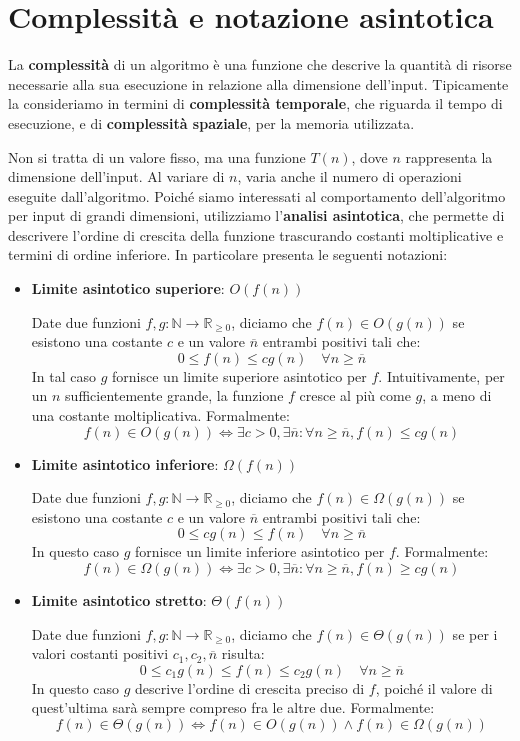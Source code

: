 \section{Complessità e notazione asintotica}
La \textbf{complessità} di un algoritmo è una funzione che descrive la quantità di risorse necessarie alla sua esecuzione in relazione alla dimensione dell’input. Tipicamente la consideriamo in termini di \textbf{complessità temporale}, che riguarda il tempo di esecuzione, e di \textbf{complessità spaziale}, per la memoria utilizzata.\par
Non si tratta di un valore fisso, ma una funzione $T(n)$, dove $n$ rappresenta la dimensione dell’input. Al variare di $n$, varia anche il numero di operazioni eseguite dall’algoritmo. Poiché siamo interessati al comportamento dell’algoritmo per input di grandi dimensioni, utilizziamo l’\textbf{analisi asintotica}, che permette di descrivere l’ordine di crescita della funzione trascurando costanti moltiplicative e termini di ordine inferiore. In particolare presenta le seguenti notazioni:
\begin{itemize}
	\item \textbf{Limite asintotico superiore}: $O(f(n))$\par
	\noindent Date due funzioni $f,g : \mathbb{N} \to \mathbb{R}_{\geq 0}$, diciamo che $f(n)\in O(g(n))$ se esistono una costante $c$ e un valore $\overline{n}$ entrambi positivi tali che: \[0 \leq f(n) \leq cg(n) \quad \forall n \geq \overline{n}\]
	\noindent In tal caso $g$ fornisce un limite superiore asintotico per $f$. Intuitivamente, per un $n$ sufficientemente grande, la funzione $f$ cresce al più come $g$, a meno di una costante moltiplicativa. Formalmente: \[f(n)\in O(g(n)) \iff \exists c>0, \exists\overline{n}: \forall n \geq \overline{n}, f(n)\leq cg(n)\]
	\item \textbf{Limite asintotico inferiore}: $\Omega(f(n))$\par
	\noindent Date due funzioni $f,g : \mathbb{N} \to \mathbb{R}_{\geq 0}$, diciamo che $f(n) \in \Omega(g(n))$ se esistono una costante $c$ e un valore $\overline{n}$ entrambi positivi tali che: \[0 \leq cg(n) \leq f(n)\quad \forall n \geq \overline{n}\]
	\noindent In questo caso $g$ fornisce un limite inferiore asintotico per $f$. Formalmente: \[f(n)\in \Omega(g(n)) \iff \exists c>0, \exists\overline{n} : \forall n \geq \overline{n}, f(n) \geq cg(n)\]
	\item \textbf{Limite asintotico stretto}: $\Theta(f(n))$\par
	\noindent Date due funzioni $f,g : \mathbb{N} \to \mathbb{R}_{\geq 0}$, diciamo che $f(n)\in \Theta(g(n))$ se per i valori costanti positivi $c_1, c_2, \overline{n}$ risulta: \[0 \leq c_1g(n) \leq f(n) \leq c_2g(n)\quad \forall n \geq \overline{n}\]
	\noindent In questo caso $g$ descrive l’ordine di crescita preciso di $f$, poiché il valore di quest'ultima sarà sempre compreso fra le altre due. Formalmente: \[f(n) \in \Theta(g(n)) \iff f(n) \in O(g(n)) \land f(n) \in \Omega(g(n))\]
\end{itemize}
